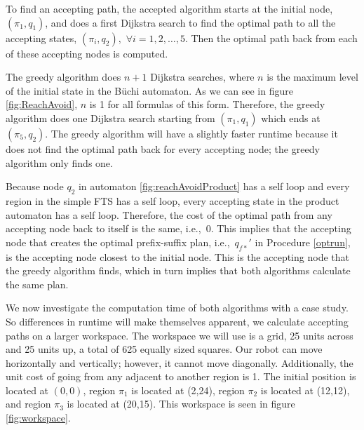 To find an accepting path, the accepted algorithm starts at the initial node, $(\pi_1,q_1)$, and does a first Dijkstra search to find the optimal path to all the accepting states, $(\pi_i,q_2),$ $\forall i = 1,2,\dots,5$. Then the optimal path back from each of these accepting nodes is computed.  
 
The greedy algorithm does $n+1$ Dijkstra searches, where $n$ is the maximum level of the initial state in the B\"{u}chi automaton. As we can see in figure \ref{fig:ReachAvoid}, $n$ is 1 for all formulas of this form. Therefore, the greedy algorithm does one Dijkstra search starting from $(\pi_1,q_1)$ which ends at $(\pi_5,q_2)$. The greedy algorithm will have a slightly faster runtime because it does not find the optimal path back for every accepting node; the greedy algorithm only finds one. 

Because node $q_2$ in automaton \ref{fig:reachAvoidProduct} has a self loop and every region in the simple FTS has a self loop, every accepting state in the product automaton has a self loop. Therefore, the cost of the optimal path from any accepting node back to itself is the same, i.e.,\ 0. This implies that the accepting node that creates the optimal prefix-suffix plan, i.e.,\ $q_{f*}'$ in Procedure \ref{optrun}, is the accepting node closest to the initial node. This is the accepting node that the greedy algorithm finds, which in turn implies that both algorithms calculate the same plan. 

We now investigate the computation time of both algorithms with a case study. So differences in runtime will make themselves apparent, we calculate accepting paths on a larger workspace. The workspace we will use is a grid, 25 units across and 25 units up, a total of 625 equally sized squares. Our robot can move horizontally and vertically; however, it cannot move diagonally. Additionally, the unit cost of going from any adjacent to another region is 1. The initial position is located at $(0,0)$, region $\pi_1$ is located at (2,24), region $\pi_2$ is located at (12,12), and region $\pi_3$ is located at (20,15). This workspace is seen in figure \ref{fig:workspace}.

